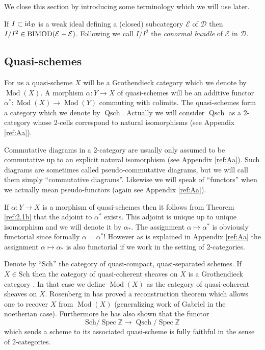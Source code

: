 \documentclass{amsproc}
\def \ZZ{{\mathbb Z}}
\def\Dscr{{\mathcal D}}
\def\Escr{{\mathcal E}}
\def\Id{\text{id}}
\def\BIMOD{\mathop{\text{BIMOD}}}
\def\QSch{\operatorname{Qsch}}
\def\Spec{\operatorname {Spec}}
\def\Qsch{\operatorname {Qsch}}
\def\Qch{\operatorname {Mod}}
\def\r{\rightarrow}
\let\oldtext\text
\def\text#1{\oldtext{\upshape #1}}
\theoremstyle{definition}
\theoremstyle{remark}
\numberwithin{equation}{section}
\numberwithin{table}{section}
\numberwithin{figure}{section}
\begin{document}
We close this section by introducing some terminology which we will
use later. 

If $I\subset \Id_\Dscr$ is a weak ideal defining a (closed)
subcategory $\Escr$ of $\Dscr$ then
$I/I^2\in\BIMOD(\Escr-\Escr)$. Following \cite{rosenberg} we call
$I/I^2$ the \emph{conormal bundle} of $\Escr$ in $\Dscr$.




\subsection{Quasi-schemes}
\label{ref:3.6b}
For us a quasi-scheme $X$ will be a Grothendieck category which we
denote by $\Qch(X)$. 
A morphism $\alpha:Y\r X$ of quasi-schemes
will be an additive functor $\alpha^\ast:\Qch(X)\r \Qch(Y)$ commuting
with colimits.
 The quasi-schemes form a category which we denote by
$\Qsch$. Actually we will consider $\Qsch$ as a 2-category whose
2-cells correspond to natural isomorphisms (see Appendix \ref{ref:Aa}).

Commutative diagrams in a 2-category are
usually only assumed to be commutative up to an explicit natural isomorphism
(see Appendix \ref{ref:Aa}). Such diagrams are sometimes called
pseudo-commutative diagrams, but we will call them simply ``commutative
diagrams''. Likewise we will speak of ``functors'' when we actually mean
pseudo-functors (again see Appendix \ref{ref:Aa}).


If $\alpha:Y\r X$ is a morphism of quasi-schemes then 
 it follows from Theorem \ref{ref:2.1b}
that the adjoint to $\alpha^\ast$ exists.
This adjoint is unique up to unique isomorphism and we will denote it
by $\alpha_\ast$. The assignment $\alpha\mapsto \alpha^*$ is obviously
functorial since formally $\alpha=\alpha^*$!  However as is explained
in Appendix \ref{ref:Aa} the assignment $\alpha\mapsto
\alpha_\ast$ is also functorial if we work in the setting of
2-categories.


Denote by ``$\mathrm{Sch}$'' the category of quasi-compact, quasi-separated
schemes. If $X\in \mathrm{Sch}$ then the category of quasi-coherent sheaves on
$X$ is a Grothendieck category \cite{thomasson}.  In that case we define
$\Qch(X)$ as the category of
quasi-coherent sheaves on $X$.  Rosenberg in \cite{rosenberg1} has
proved a reconstruction theorem which allows one to recover $X$ from
$\Qch(X)$ (generalizing work of Gabriel in the noetherian case).
Furthermore he has also shown that the functor
\[
\mathrm{Sch}/\Spec \ZZ\r \QSch/\Spec \ZZ
\]
which sends a scheme to its associated quasi-scheme is fully faithful
in the sense of $2$-categories.
\end{document}
